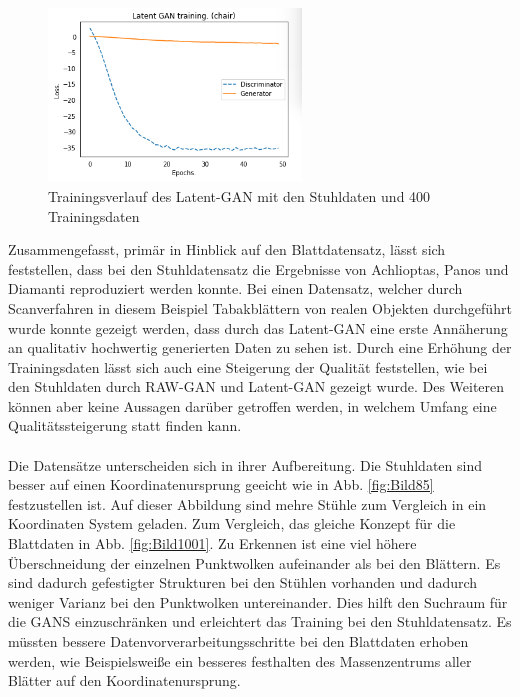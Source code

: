 \documentclass{llncs}
\begin{document}
\begin{figure}[htbp] 
	\centering
	\includegraphics[width=0.6\textwidth]{raw_gan_latent_gan_chair_result_400_example.png}
	\caption{Trainingsverlauf des Latent-GAN mit den Stuhldaten und 400 Trainingsdaten}
	\label{fig:Bild65}
\end{figure}
\pagebreak\linebreak
Zusammengefasst, primär in Hinblick auf den Blattdatensatz, lässt sich feststellen, dass bei den Stuhldatensatz die Ergebnisse von Achlioptas, Panos und Diamanti \cite{3dgan} reproduziert werden konnte. Bei einen Datensatz, welcher durch Scanverfahren in diesem Beispiel Tabakblättern von realen Objekten durchgeführt wurde konnte gezeigt werden, dass durch das Latent-GAN eine erste Annäherung an qualitativ hochwertig generierten Daten zu sehen ist. Durch eine Erhöhung der Trainingsdaten lässt sich auch eine Steigerung der Qualität feststellen, wie bei den Stuhldaten durch RAW-GAN und Latent-GAN gezeigt wurde. Des Weiteren können aber keine Aussagen darüber getroffen werden, in welchem Umfang eine Qualitätssteigerung statt finden kann. 
\\\\
Die Datensätze unterscheiden sich in ihrer Aufbereitung. Die Stuhldaten sind besser auf einen Koordinatenursprung geeicht wie in Abb. \ref{fig:Bild85} festzustellen ist. Auf dieser Abbildung sind mehre Stühle zum Vergleich in ein Koordinaten System geladen. Zum Vergleich, das gleiche Konzept für die Blattdaten in Abb. \ref{fig:Bild1001}.
Zu Erkennen ist eine viel höhere Überschneidung der einzelnen Punktwolken aufeinander als bei den Blättern. Es sind dadurch gefestigter Strukturen bei den Stühlen vorhanden und dadurch weniger Varianz bei den Punktwolken untereinander. Dies hilft den Suchraum für die GANS einzuschränken und erleichtert das Training bei den Stuhldatensatz. Es müssten bessere Datenvorverarbeitungsschritte bei den Blattdaten erhoben werden, wie Beispielsweiße ein besseres festhalten des Massenzentrums aller Blätter auf den Koordinatenursprung.
\end{document}
